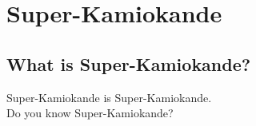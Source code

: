 
%
%

\section{Super-Kamiokande}\label{Section_002}

\subsection{What is Super-Kamiokande?}
\vs\hs Super-Kamiokande is Super-Kamiokande.\\
Do you know Super-Kamiokande? \cite{2003Fukuda}

\newpage
